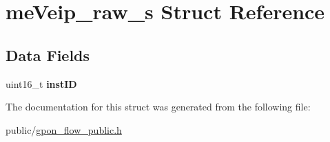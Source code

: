 \hypertarget{structmeVeip__raw__s}{}\section{me\+Veip\+\_\+raw\+\_\+s Struct Reference}
\label{structmeVeip__raw__s}
\subsection*{Data Fields}
\begin{DoxyCompactItemize}
\item 
\mbox{\label{structmeVeip__raw__s_a3e14fef8788c0973be9e8d42d3c545d7}} 
uint16\+\_\+t {\bfseries inst\+ID}
\end{DoxyCompactItemize}


The documentation for this struct was generated from the following file\+:\begin{DoxyCompactItemize}
\item 
public/\hyperlink{gpon__flow__public_8h}{gpon\+\_\+flow\+\_\+public.\+h}\end{DoxyCompactItemize}
